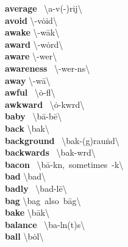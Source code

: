 \documentclass[10pt,a4paper]{article}
\begin{document}
\begin{multicols}{2}
\textbf{ average }\quad \ \textbackslash \textprimstress a-v(\textschwa -)rij\textbackslash \\
\textbf{ avoid }\quad \textbackslash \textschwa -\textprimstress v\.{o}id\textbackslash \\
\textbf{ awake }\quad \textbackslash \textschwa -\textprimstress w\={a}k\textbackslash \\
\textbf{ award }\quad \textbackslash \textschwa -\textprimstress w\.{o}rd\textbackslash \\
\textbf{ aware }\quad \textbackslash \textschwa -\textprimstress wer\textbackslash \\
\textbf{ awareness }\quad \ \textbackslash \textschwa -\textprimstress wer-n\textschwa s\textbackslash \\
\textbf{ away }\quad \textbackslash \textschwa -\textprimstress w\={a}\textbackslash \\
\textbf{ awful }\quad \ \textbackslash \textprimstress \.{o}-f\textschwa l\textbackslash \\
\textbf{ awkward }\quad \ \textbackslash \textprimstress \.{o}-kw\textschwa rd\textbackslash \\
\textbf{ baby }\quad \ \textbackslash \textprimstress b\={a}-b\={e}\textbackslash \\
\textbf{ back }\quad \textbackslash \textprimstress bak\textbackslash \\
\textbf{ background }\quad \ \textbackslash \textprimstress bak-\textsecstress (g)rau\. nd\textbackslash \\
\textbf{ backwards }\quad \ \textbackslash \textprimstress bak-w\textschwa rd\textbackslash \\
\textbf{ bacon }\quad \ \textbackslash \textprimstress b\={a}-k\textschwa n,\ sometimes\ -k\textsuperscript{\textreve}\engma \textbackslash \\
\textbf{ bad }\quad \textbackslash \textprimstress bad\textbackslash \\
\textbf{ badly }\quad \ \textbackslash \textprimstress bad-l\={e}\textbackslash \\
\textbf{ bag }\quad \textbackslash \textprimstress bag\ also\ \textprimstress b\={a}g\textbackslash \\
\textbf{ bake }\quad \textbackslash \textprimstress b\={a}k\textbackslash \\
\textbf{ balance }\quad \ \textbackslash \textprimstress ba-l\textschwa n(t)s\textbackslash \\
\textbf{ ball }\quad \textbackslash \textprimstress b\.{o}l\textbackslash \\

\end{multicols}
\end{document}
